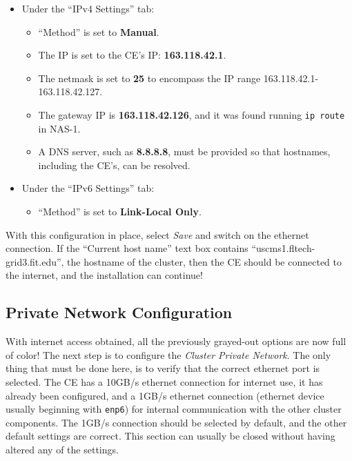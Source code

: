 \documentclass[12pt]{article}
\begin{document}
\begin{itemize}
\item Under the ``IPv4 Settings'' tab:
  \begin{itemize}
  \item ``Method'' is set to \textbf{Manual}.
  \item The IP is set to the CE's IP: \textbf{163.118.42.1}.
  \item The netmask is set to \textbf{25} to encompass the IP range
    163.118.42.1-163.118.42.127.
  \item The gateway IP is \textbf{163.118.42.126}, and it was found running
    {\tt ip route} in NAS-1.
  \item A DNS server, such as \textbf{8.8.8.8}, must be provided so that
    hostnames, including the CE's, can be resolved.
  \end{itemize}
\item Under the ``IPv6 Settings'' tab:
  \begin{itemize}
  \item ``Method'' is set to \textbf{Link-Local Only}.
  \end{itemize}
\end{itemize}

\qq With this configuration in place, select \textit{Save} and switch on the
ethernet connection. If the ``Current host name'' text box contains
``uscms1.fltech-grid3.fit.edu'', the hostname of the cluster, then the CE should
be connected to the internet, and the installation can continue! 

\subsection{Private Network Configuration}

\qq With internet access obtained, all the previously grayed-out options are now
full of color! The next step is to configure the \textit{Cluster Private
  Network}. The only thing that must be done here, is to verify that the correct
ethernet port is selected. The CE has a 10GB/s ethernet connection for internet
use, it has already been configured, and a 1GB/s ethernet connection (ethernet
device usually beginning with {\tt enp6}) for internal communication with the
other cluster components. The 1GB/s connection should be selected by default,
and the other default settings are correct. This section can usually be closed
without having altered any of the settings.
\end{document}
